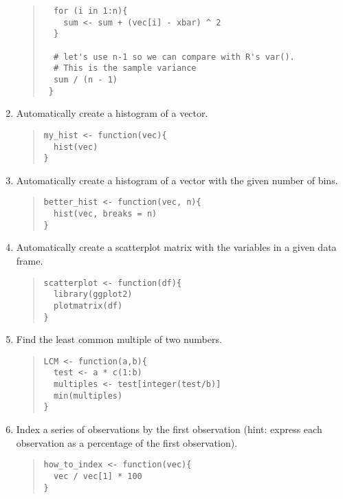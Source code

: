 \documentclass{article}
\begin{document}
\begin{enumerate}
\begin{quote}
\begin{verbatim}
  for (i in 1:n){
  	sum <- sum + (vec[i] - xbar) ^ 2
  }
  
  # let's use n-1 so we can compare with R's var(). 
  # This is the sample variance
  sum / (n - 1)
 }	

    \end{verbatim}
  \end{quote}



\item Automatically create a histogram of a vector.
  \begin{quote}
    \begin{verbatim}
my_hist <- function(vec){
  hist(vec)
}
    \end{verbatim}
  \end{quote}

\item Automatically create a histogram of a vector with the given number of bins.
  \begin{quote}
    \begin{verbatim}
better_hist <- function(vec, n){
  hist(vec, breaks = n)
}
    \end{verbatim}
  \end{quote}
  
\item Automatically create a scatterplot matrix with the variables in a given data frame.
  \begin{quote}
    \begin{verbatim}
scatterplot <- function(df){
  library(ggplot2)
  plotmatrix(df)
}
    \end{verbatim}
  \end{quote}
  

\item Find the least common multiple of two numbers.
  \begin{quote}
    \begin{verbatim}
LCM <- function(a,b){
  test <- a * c(1:b)
  multiples <- test[integer(test/b)] 
  min(multiples)
} 
    \end{verbatim}
  \end{quote}

\item Index a series of observations by the first observation (hint: express each observation as a percentage of the first observation).
  \begin{quote}
    \begin{verbatim}
how_to_index <- function(vec){
  vec / vec[1] * 100
}     
    \end{verbatim}
  \end{quote}


\end{enumerate}
\end{document}

